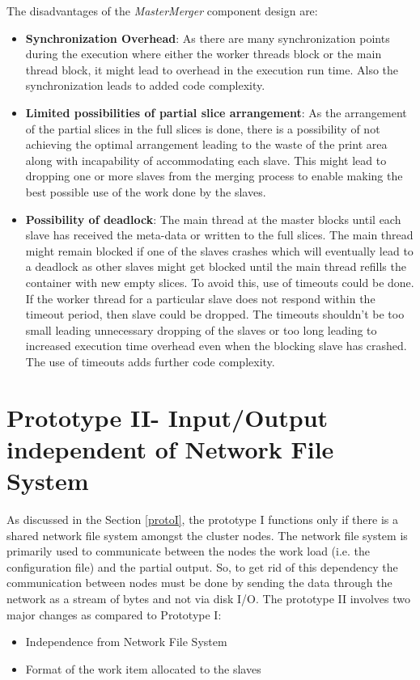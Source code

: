The disadvantages of the \textit{MasterMerger} component design are:
\begin{itemize}
\item \textbf{Synchronization Overhead}: As there are many synchronization points during the execution where either the worker threads block or the main thread block, it might lead to overhead in the execution run time. Also the synchronization leads to added code complexity. 
\item \textbf{Limited possibilities of partial slice arrangement}: As the arrangement of the partial slices in the full slices is done, there is a possibility of not achieving the optimal arrangement leading to the waste of the print area along with incapability of accommodating each slave. This might lead to dropping one or more slaves from the merging process to enable making the best possible use of the work done by the slaves.  
\item \textbf{Possibility of deadlock}: The main thread at the master blocks until each slave has received the meta-data or written to the full slices. The main thread might remain blocked if one of the slaves crashes which will eventually lead to a deadlock as other slaves might get blocked until the main thread refills the container with new empty slices. To avoid this, use of timeouts could be done. If the worker thread for a particular slave does not respond within the timeout period, then slave could be dropped. The timeouts shouldn't be too small leading unnecessary dropping of the slaves or too long leading to increased execution time overhead even when the blocking slave has crashed. The use of timeouts adds further code complexity.
\end{itemize}

\section{Prototype II- Input/Output independent of Network File System }

As discussed in the Section \ref{protoI}, the prototype I functions only if there is a shared network file system amongst the cluster nodes. The network file system is primarily used to communicate between the nodes the work load (i.e. the configuration file) and the partial output. So, to get rid of this dependency the communication between nodes must be done by sending the data through the network as a stream of bytes and not via disk I/O. The prototype II involves two major changes as compared to Prototype I: 
\begin{itemize}
\item Independence from Network File System 
\item Format of the work item allocated to the slaves
\end{itemize}  

